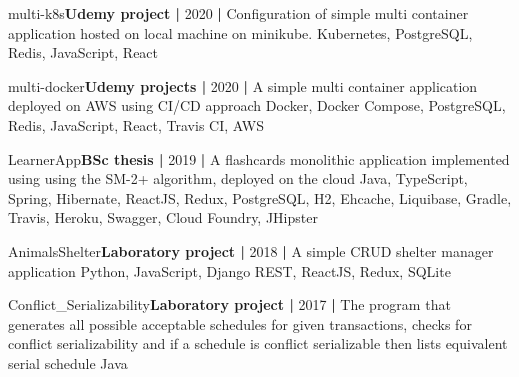
\begin{projects}

	\project
	{multi-k8s}{\textbf{Udemy project |} 2020 \textbf{|}}
	{}
	{Configuration of simple multi container application hosted on local machine on minikube.}
	{Kubernetes, PostgreSQL, Redis, JavaScript, React}
	
	\project
	{multi-docker}{\textbf{Udemy projects |} 2020 \textbf{|}}
	{}
	{A simple multi container application deployed on AWS using CI/CD approach }
	{Docker, Docker Compose, PostgreSQL, Redis, JavaScript, React, Travis CI, AWS}
	
	\project
	{LearnerApp}{\textbf{BSc thesis |} 2019 \textbf{|}}
	{}
	{A flashcards monolithic application implemented using using the SM-2+ algorithm, deployed on the cloud}
	{Java, TypeScript, Spring, Hibernate, ReactJS, Redux, PostgreSQL, H2, Ehcache, Liquibase, Gradle, Travis, Heroku, Swagger, Cloud Foundry, JHipster}	
	
	\project
	{AnimalsShelter}{\textbf{Laboratory project |} 2018 \textbf{|}}
	{}
	{A simple CRUD shelter manager application}
	{Python, JavaScript, Django REST, ReactJS, Redux, SQLite}
	
	\project
	{Conflict\_Serializability}{\textbf{Laboratory project |} 2017 \textbf{|}}
	{}
	{The program that generates all possible acceptable schedules for given transactions, checks for conflict serializability and if a schedule is conflict serializable then lists equivalent serial schedule}
	{Java}
\end{projects}

